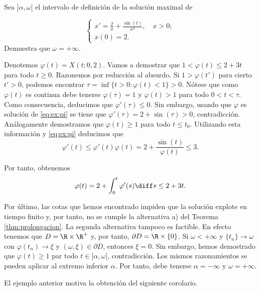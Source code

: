 \documentclass{article}
\begin{document}
\begin{ex}
  Sea $]\alpha, \omega[$ el intervalo de definición de la solución maximal de
  
  \begin{equation}
    \label{eq:ex:pi}
    \begin{cases}
      x' = \frac{2}{x} + \frac{\sin(t)}{x^2}, \quad x > 0; \\
      x(0) = 2.
    \end{cases}
  \end{equation}
  Demuestra que $\omega = +\infty$.

  Denotemos $\varphi(t) = X(t; 0,2)$. Vamos a demostrar que $1 < \varphi(t) \le 2+3t$ para todo
  $t \ge 0$. Razonemos por reducción al absurdo. Si $1 > \varphi(t')$ para cierto $t' > 0$, podemos
  encontrar $\tau = \inf \{t > 0: \varphi(t) < 1\} > 0$. Nótese que como $\varphi(t)$ es continua
  debe tenerse $\varphi(\tau) = 1$ y $\varphi(t) > 1$ para todo $0 < t < \tau$. Como consecuencia,
  deducimos que $\varphi'(\tau) \le 0$. Sin embargo, usando que $\varphi$ es solución de
  \eqref{eq:ex:pi} se tiene que $\varphi'(\tau) = 2 + \sin(\tau) > 0$, contradicción. Análogamente
  demostramos que $\varphi(t) \ge 1$ para todo $t \le t_0$. Utilizando esta información y
  \eqref{eq:ex:pi} deducimos que
  \[\varphi'(t) \le \varphi'(t) \varphi(t) = 2 + \frac{\sin(t)}{\varphi(t)} \le 3.\]

  Por tanto, obtenemos
  \[ \varphi(t) = 2 + \int_{0}^{t} \varphi'(s) \diff s \le 2 +3t.\]

  Por último, las cotas que hemos encontrado impiden que la solución explote en tiempo finito y, por
  tanto, no se cumple la alternativa a) del Teorema \ref{thm:prolongacion}. La segunda alternativa
  tampoco es factible. En efecto tenemos que $D = \R \times \R^+$ y, por tanto,
  $\partial D = \R \times \{0\}$. Si $\omega < +\infty$ y $\{t_n\} \to \omega$ con
  $\varphi(t_n) \to \xi$ y $(\omega, \xi) \in \partial D$, entonces $\xi = 0$. Sin embargo, hemos
  demostrado que $\varphi(t) \ge 1$ par todo $t \in ]\alpha, \omega[$, contradicción. Los mismos
  razonamientos se pueden aplicar al extremo inferior $\alpha$. Por tanto, debe tenerse
  $\alpha = -\infty$ y $\omega = +\infty$.
\end{ex}

El ejemplo anterior motiva la obtención del siguiente corolario.
\end{document}

